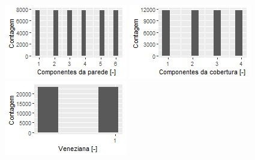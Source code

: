 \documentclass{article}
\begin{document}
\begin{figure}[h!]
\begin{minipage}{.33\textwidth}
	\end{minipage}
	\centering	
	\begin{minipage}{.33\textwidth}
		\centering
		\includegraphics[width=\linewidth]{plot_shell_wall.png}
	\end{minipage}%
	\begin{minipage}{.33\textwidth}
		\centering
		\includegraphics[width=\linewidth]{plot_shell_roof.png}
	\end{minipage}%
	\begin{minipage}{.33\textwidth}
		\centering
		\includegraphics[width=\linewidth]{plot_blind.png}

\end{minipage}
\end{figure}
\end{document}
